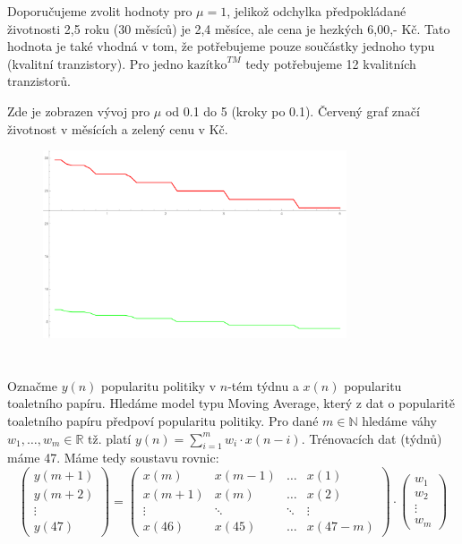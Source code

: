 \documentclass[12pt, a4paper]{article}
\begin{document}
Doporučujeme zvolit hodnoty pro $\mu=1$, jelikož odchylka předpokládané životnosti 2,5 roku (30 měsíců) je 2,4 měsíce, ale cena je hezkých 6,00,- Kč. Tato hodnota je také vhodná v tom, že potřebujeme pouze součástky jednoho typu (kvalitní tranzistory). Pro jedno $\text{kazítko}^{TM}$ tedy potřebujeme 12 kvalitních tranzistorů.

Zde je zobrazen vývoj pro $\mu$ od 0.1 do 5 (kroky po 0.1). Červený graf značí životnost v měsících a zelený cenu v Kč.
\begin{figure}[h]
\centering
\includegraphics[width=0.8\textwidth]{graf.pdf}
\end{figure}

\section{}
Označme $y(n)$ popularitu politiky v $n$-tém týdnu a $x(n)$ popularitu toaletního papíru. Hledáme model typu Moving Average, který z dat o popularitě toaletního papíru předpoví popularitu politiky. Pro dané $m \in \mathbb{N}$ hledáme váhy $w_1,\dots, w_m \in \mathbb{R}$ tž. platí $y(n)=\sum^{m}_{i=1} w_i \cdot x(n-i)$. Trénovacích dat (týdnů) máme 47. Máme tedy soustavu rovnic:
\[
\begin{pmatrix}
y(m+1)\\
y(m+2)\\
\vdots\\
y(47)
\end{pmatrix}
= 
\begin{pmatrix}
x(m) & x(m-1) & \dots & x(1)\\
x(m+1) & x(m) & \dots & x(2)\\
\vdots & \ddots & \ddots & \vdots\\
x(46) & x(45) & \dots & x(47-m)
\end{pmatrix}
\cdot
\begin{pmatrix}
w_1 \\
w_2 \\
\vdots\\
w_m
\end{pmatrix}
\]
\end{document}
